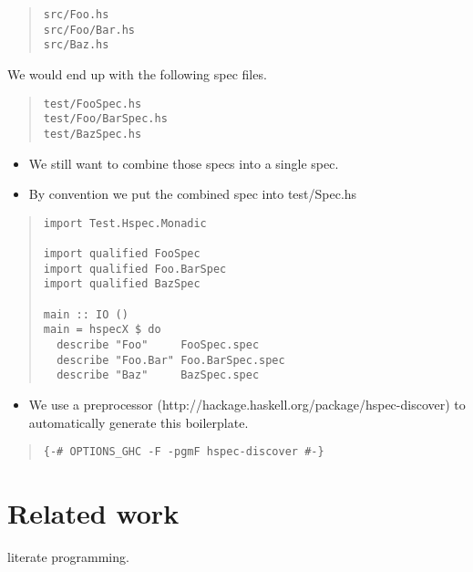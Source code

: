 \documentclass[preprint]{sigplanconf}
\begin{document}
\begin{quote}
\begin{verbatim}
src/Foo.hs
src/Foo/Bar.hs
src/Baz.hs
\end{verbatim}
\end{quote}

\noindent We would end up with the following spec files.

\begin{quote}
\begin{verbatim}
test/FooSpec.hs
test/Foo/BarSpec.hs
test/BazSpec.hs
\end{verbatim}
\end{quote}

\begin{itemize}
\item We still want to combine those specs into a single spec.
\item By convention we put the combined spec into test/Spec.hs
\end{itemize}

\begin{quote}
\begin{verbatim}
import Test.Hspec.Monadic

import qualified FooSpec
import qualified Foo.BarSpec
import qualified BazSpec

main :: IO ()
main = hspecX $ do
  describe "Foo"     FooSpec.spec
  describe "Foo.Bar" Foo.BarSpec.spec
  describe "Baz"     BazSpec.spec
\end{verbatim}
\end{quote}

\begin{itemize}
\item We use a preprocessor (http://hackage.haskell.org/package/hspec-discover) to automatically generate this boilerplate.
\end{itemize}

\begin{quote}
\begin{verbatim}
{-# OPTIONS_GHC -F -pgmF hspec-discover #-}
\end{verbatim}
\end{quote}

\section{Related work}

literate programming.
\end{document}
